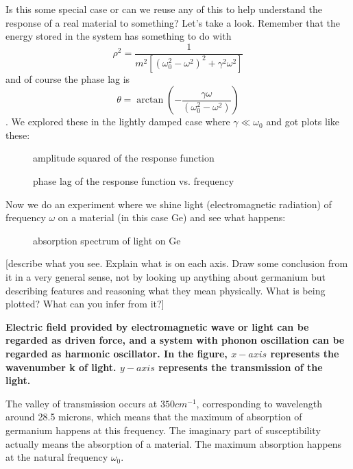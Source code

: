 \documentclass[]{revtex4}
\newcommand{\st}[1]{{\color{red}\bfseries #1}}
\begin{document}
  
  Is this some special case or can we reuse any of this to help understand the response of a real material to something?  Let's take a look.
  Remember that the energy stored in the system has something to do with
  \[\rho^2= \frac{1}{m^2[(\omega_0^2-\omega^2)^2+\gamma^2\omega^2]}\]
  and of course the phase lag is
  \[\theta=\arctan\left(-\frac{\gamma\omega}{(\omega_0^2-\omega^2)}\right)\].
  We explored these in the lightly damped case where $\gamma \ll \omega_0$ and got plots like these:
  \begin{figure}[H]\begin{center}
      \caption{amplitude squared of the response function}
  \end{center}\end{figure}
  \begin{figure}[H]\begin{center}
      \caption{phase lag of the response function vs. frequency}
  \end{center}\end{figure}
  
  Now we do an experiment where we shine light (electromagnetic radiation) of frequency $\omega$ on a material (in this case Ge) and see what happens:
  \begin{figure}[H]\begin{center}
      \caption{absorption spectrum of light on Ge}
  \end{center}\end{figure}
  [describe what you see.  Explain what is on each axis. Draw some conclusion from it in a very general sense, not by looking up anything about germanium but
  describing features and reasoning what they mean physically.  What is being plotted?  What can you infer from it?]
  
  \st{
    Electric field provided by electromagnetic wave or light can be regarded as driven force, and a system with  phonon oscillation can be regarded as harmonic oscillator. In the figure, $x-axis$ represents the wavenumber k of light. $y -axis$ represents the transmission of the light.
    
    The valley of transmission occurs at $350 cm^{-1}$, corresponding to wavelength around 28.5 microns, which means that the maximum of absorption of germanium happens at this frequency. The imaginary part of susceptibility actually means the absorption of a material. The maximum absorption happens at the natural frequency $\omega_0$.
  }
  
\end{document}
